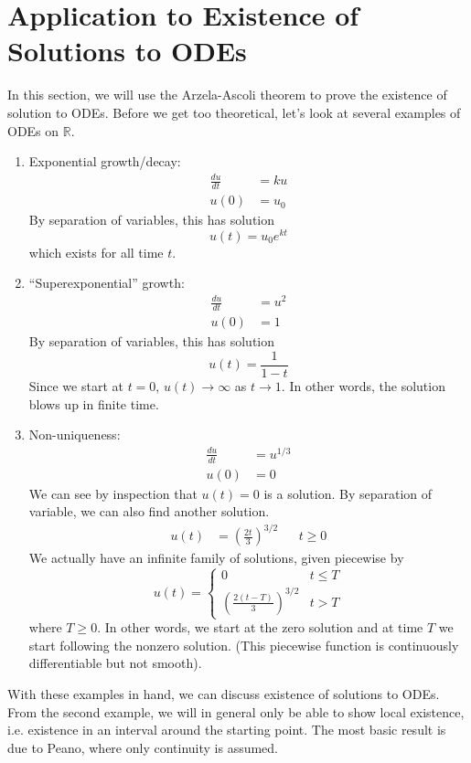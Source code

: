 \documentclass[12pt]{amsart}         %
\theoremstyle{remark}
\newcommand{\R}{\mathbb{R}}
\begin{document}
\section{Application to Existence of Solutions to ODEs}

In this section, we will use the Arzela-Ascoli theorem to prove the existence of solution to ODEs. Before we get too theoretical, let's look at several examples of ODEs on $\R$.

\begin{enumerate}
\item Exponential growth/decay:
\begin{align*}
\frac{du}{dt} &= k u \\
u(0) &= u_0 
\end{align*}
By separation of variables, this has solution
\[
u(t) = u_0 e^{kt}
\]
which exists for all time $t$.

\item ``Superexponential'' growth:
\begin{align*}
\frac{du}{dt} &= u^2 \\
u(0) &= 1
\end{align*}
By separation of variables, this has solution
\[
u(t) = \frac{1}{1 - t}
\]
Since we start at $t = 0$, $u(t) \rightarrow \infty$ as $t \rightarrow 1$. In other words, the solution blows up in finite time.

\item Non-uniqueness:
\begin{align*}
\frac{du}{dt} &= u^{1/3} \\
u(0) &= 0
\end{align*}
We can see by inspection that $u(t) = 0$ is a solution. By separation of variable, we can also find another solution.
\begin{align*}
u(t) &= \left( \frac{2t}{3} \right)^{3/2} && t \geq 0
\end{align*}
We actually have an infinite family of solutions, given piecewise by
\[
u(t) = \begin{cases}
0 & t \leq T \\
\left( \frac{2(t-T)}{3} \right)^{3/2} & t > T
\end{cases}
\]
where $T \geq 0$. In other words, we start at the zero solution and at time $T$ we start following the nonzero solution. (This piecewise function is continuously differentiable but not smooth).
\end{enumerate}

With these examples in hand, we can discuss existence of solutions to ODEs. From the second example, we will in general only be able to show local existence, i.e. existence in an interval around the starting point. The most basic result is due to Peano, where only continuity is assumed. 
\end{document}
